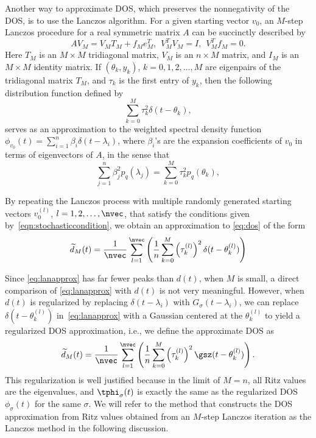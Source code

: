 \documentclass{article}
\newcommand{\wt}{\widetilde}
\begin{document}
Another way to approximate DOS, which preserves the nonnegativity of the DOS, is to 
use the Lanczos algorithm. For a given starting vector $v_0$, an $M$-step Lanczos procedure for a
real symmetric matrix $A$ can be succinctly described by
\begin{equation}
  AV_M = V_M T_M + f_M e_M^T, \ \ V_M^TV_M = I, \ \ V_M^Tf_M = 0.
  \label{eq:lanfact}
\end{equation}
Here $T_M$ is an $M\times M$ tridiagonal matrix, $V_{M}$ is an
$n\times M$ matrix, and $I_{M}$ is an $M\times M$
identity matrix.
If $(\theta_{k},y_{k})$, $k=0,1,2,\ldots,M$ are eigenpairs of the
tridiagonal matrix $T_M$, and $\tau_{k}$ is the first
entry of $y_{k}$, then the following distribution function defined by
\begin{equation}
        \sum_{k=0}^M \tau_{k}^2 \delta(t-\theta_k),
\label{eq:landist}
\end{equation}
serves as an approximation to the weighted spectral density function
$\phi_{v_0}(t) = \sum_{i=1}^n \beta_i \delta(t-\lambda_i)$, where $\beta_i$'s are the expansion coefficients of $v_0$ in  terms of eigenvectors of $A$, in the sense that
\begin{equation}
\sum_{j=1}^n \beta_{j}^2 p_q(\lambda_j) = \sum_{k=0}^M \tau_{k}^2 
p_q(\theta_k), 
\label{eq:tauexpand}
\end{equation}

By repeating the Lanczos process with multiple randomly generated starting
vectors $v^{(l)}_0$, $l = 1,2,\ldots,\nvec$, that satisfy the
conditions given by~\eqref{eqn:stochasticcondition}, we obtain an approximation to \eqref{eq:dos} of the form
\begin{equation}
\wt{d}_M(t) = \frac{1}{\nvec} \sum_{l=1}^{\nvec}\left(
\frac{1}{n} \sum_{k=0}^{M}  \left(\tau_{k}^{(l)}\right)^2
\delta(t-\theta_{k}^{(l)}) \right)
\label{eq:lanapprox}
\end{equation}

Since \eqref{eq:lanapprox} has far fewer peaks than $d(t)$,
when $M$ is small, a direct comparison of \eqref{eq:lanapprox} with
$d(t)$ is not very meaningful.  However, when $d(t)$ is
regularized by replacing $\delta(t-\lambda_i)$ with $G_\sigma(t-\lambda_i)$,
we can replace $\delta(t-\theta_k^{(l)})$ in~\eqref{eq:lanapprox} with a
Gaussian centered at the $\theta_k^{(l)}$ to yield a regularized DOS
approximation, i.e., we define the approximate DOS as
\begin{equation}
        \wt{d}_M(t) = \frac{1}{\nvec}\sum_{l=1}^{\nvec}\left(\frac{1}{n}
        \sum_{k=0}^{M} \left(\tau_{k}^{(l)}\right)^2
        \gsz(t-\theta_{k}^{(l)})\right).
        \label{eqn:landos}
\end{equation}
This regularization is well justified because in the limit of $M = n$,
all Ritz values are the eigenvalues, and $\tphi_{\sigma}(t)$ is exactly the
same as the regularized DOS $\phi_{\sigma}(t)$ for the same $\sigma$.
We will refer to the method that constructs the DOS approximation from
Ritz values obtained from an $M$-step Lanczos iteration as the Lanczos
method in the following discussion.
\end{document}
